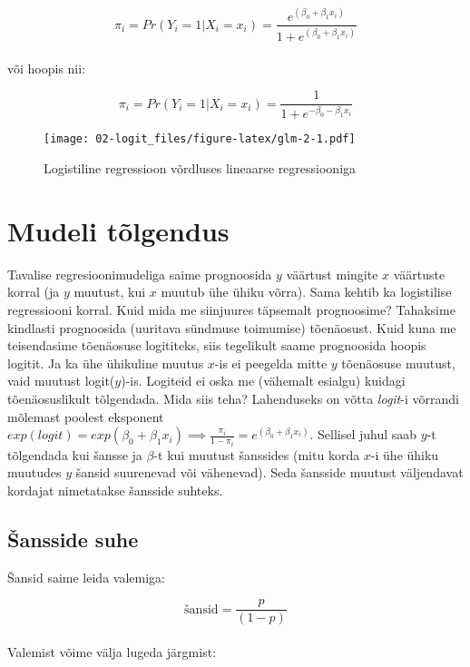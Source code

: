 \documentclass[
]{book}
\begin{document}
\[\pi_i=Pr(Y_i=1|X_i=x_i)=\dfrac{e^{(\beta_0+\beta_1 x_i)}}{1+e^{(\beta_0+\beta_1 x_i)}}\]\\
või hoopis nii:

\[\pi_i=Pr(Y_i=1|X_i=x_i)=\frac{1}{1+e^{-\beta_0-\beta_1 x_i}}\]

\begin{figure}
\centering
\texttt{[image: 02-logit\_files/figure-latex/glm-2-1.pdf]}
\caption{\label{fig:glm-2}Logistiline regressioon võrdluses lineaarse regressiooniga}
\end{figure}

\hypertarget{mudeli-tuxf5lgendus}{%
\section{Mudeli tõlgendus}\label{mudeli-tuxf5lgendus}}

Tavalise regresioonimudeliga saime prognoosida \(y\) väärtust mingite \(x\) väärtuste korral (ja \(y\) muutust, kui \(x\) muutub ühe ühiku võrra). Sama kehtib ka logistilise regressiooni korral. Kuid mida me siinjuures täpsemalt prognoosime? Tahaksime kindlasti prognoosida (uuritava sündmuse toimumise) tõenäosust. Kuid kuna me teisendasime tõenäosuse logititeks, siis tegelikult saame prognoosida hoopis logitit. Ja ka ühe ühikuline muutus \(x\)-is ei peegelda mitte \(y\) tõenäosuse muutust, vaid muutust logit(\(y\))-is. Logiteid ei oska me (vähemalt esialgu) kuidagi tõenäosuslikult tõlgendada. Mida siis teha? Lahenduseks on võtta \emph{logit}-i võrrandi mõlemast poolest eksponent \(exp(logit) = exp(\beta_0+\beta_1 x_i) \implies \frac{\pi_i}{1-\pi_i}=e^{({\beta_0}+\beta_1 x_i)}\). Sellisel juhul saab \(y\)-t tõlgendada kui šansse ja \(\beta\)-t kui muutust šanssides (mitu korda \(x\)-i ühe ühiku muutudes \(y\) šansid suurenevad või vähenevad). Seda šansside muutust väljendavat kordajat nimetatakse šansside suhteks.

\hypertarget{ux161ansside-suhe}{%
\subsection{Šansside suhe}\label{ux161ansside-suhe}}

Šansid saime leida valemiga:

\[\text{šansid}=\frac{p}{(1-p)}\]\\
Valemist võime välja lugeda järgmist:
\end{document}
